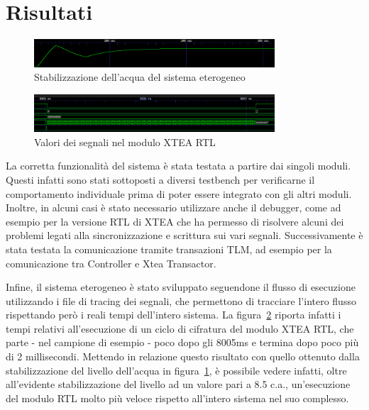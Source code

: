 \documentclass[]{IEEEtran}
\begin{document}
\section{Risultati}

\begin{figure}[tb!]
	\centering
	\includegraphics[width=0.8\textwidth]{figures/water_level_heterogeneous.png}
	\caption{Stabilizzazione dell'acqua del sistema eterogeneo}
	\label{fig:water_heterogeneous}
\end{figure}
\begin{figure}[tb!]
	\centering
	\includegraphics[width=0.8\textwidth]{figures/rtl_signals.png}
	\caption{Valori dei segnali nel modulo XTEA RTL}
	\label{fig:rtl_sig}
\end{figure}

La corretta funzionalit\`a del sistema \`e stata testata a partire dai singoli moduli. Questi infatti sono stati 
sottoposti a diversi testbench per verificarne il comportamento individuale prima di poter essere integrato con gli altri
moduli. Inoltre, in alcuni casi \`e stato necessario utilizzare anche il debugger, come ad esempio per la versione RTL di 
XTEA che ha permesso di risolvere alcuni dei problemi legati alla sincronizzazione e scrittura sui vari segnali.
Successivamente \`e stata testata la comunicazione tramite transazioni TLM, ad esempio per la comunicazione tra
Controller e Xtea Transactor. 

Infine, il sistema eterogeneo è stato sviluppato seguendone il flusso di esecuzione utilizzando i file di tracing dei 
segnali, che permettono di tracciare l'intero flusso rispettando per\`o i reali tempi dell'intero sistema.
La figura~\ref{fig:rtl_sig} riporta infatti i tempi relativi all'esecuzione di un ciclo di cifratura del modulo XTEA RTL,
che parte - nel campione di esempio - poco dopo gli 8005ms e termina dopo poco pi\`u di 2 millisecondi.
Mettendo in relazione questo risultato con quello ottenuto dalla stabilizzazione del livello dell'acqua in 
figura~\ref{fig:water_heterogeneous}, \`e possibile vedere infatti, oltre all'evidente stabilizzazione del livello ad un
valore pari a 8.5 c.a., un'esecuzione del modulo RTL molto pi\`u veloce rispetto all'intero sistema nel suo complesso.
\end{document}
